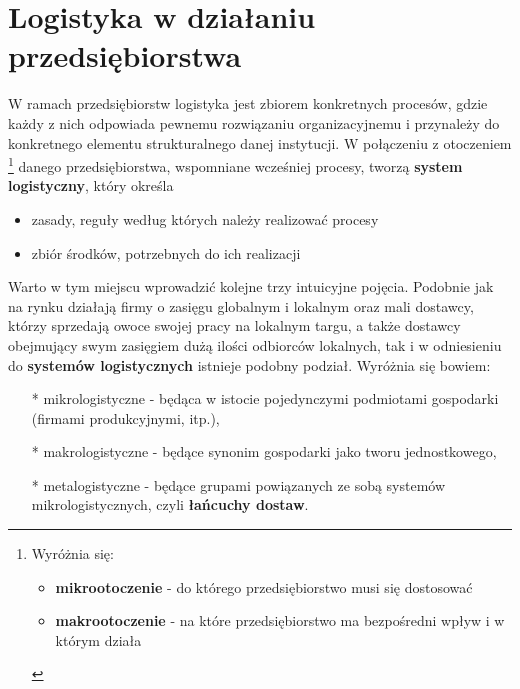 \section{Logistyka w działaniu przedsiębiorstwa}  
	W ramach przedsiębiorstw logistyka jest zbiorem konkretnych procesów, 
	gdzie każdy z nich odpowiada pewnemu rozwiązaniu organizacyjnemu i przynależy do konkretnego 
	elementu strukturalnego danej instytucji. W połączeniu z otoczeniem
	\footnote{
		Wyróżnia się:
		\begin{itemize}
			\item \textbf{mikrootoczenie} - do którego przedsiębiorstwo musi się dostosować
			\item \textbf{makrootoczenie} - na które przedsiębiorstwo ma bezpośredni wpływ i w którym działa
		\end{itemize}			
	}
	danego przedsiębiorstwa, wspomniane wcześniej procesy, tworzą \textbf{system logistyczny}, który określa
	\begin{itemize}
		\item zasady, reguły według których należy realizować procesy
		\item zbiór środków, potrzebnych do ich realizacji
	\end{itemize}
	Warto w tym miejscu wprowadzić kolejne trzy intuicyjne pojęcia. Podobnie jak na rynku
	działają firmy o zasięgu globalnym i lokalnym oraz mali dostawcy, którzy sprzedają
	owoce swojej pracy na lokalnym targu, a także dostawcy obejmujący swym zasięgiem dużą ilości
	odbiorców lokalnych, tak i w odniesieniu do \textbf{systemów logistycznych}
	istnieje podobny podział. Wyróżnia się bowiem:
	\begin{itemize}
		\item[*] mikrologistyczne 	- będąca w istocie pojedynczymi podmiotami gospodarki (firmami produkcyjnymi, itp.),
		\item[*] makrologistyczne 	- będące synonim gospodarki jako tworu jednostkowego,
		\item[*] metalogistyczne	- będące grupami powiązanych ze sobą systemów mikrologistycznych, 
		czyli \textbf{łańcuchy dostaw}\cite{systemy_logistyczne_podstawy_funkcjonowania}.
	\end{itemize}
%		
